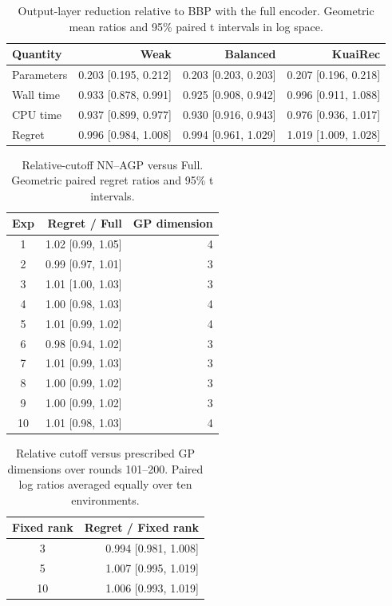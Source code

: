 \begin{table}[htbp]
\centering\small
\caption{Output-layer reduction relative to BBP with the full encoder. Geometric mean ratios and 95\% paired t intervals in log space.}
\label{tab:network-cost-detail}
\begin{tabular}{@{}lrrr@{}}
\toprule
Quantity & Weak & Balanced & KuaiRec \\
\midrule
Parameters & 0.203 [0.195, 0.212] & 0.203 [0.203, 0.203] & 0.207 [0.196, 0.218] \\
Wall time & 0.933 [0.878, 0.991] & 0.925 [0.908, 0.942] & 0.996 [0.911, 1.088] \\
CPU time & 0.937 [0.899, 0.977] & 0.930 [0.916, 0.943] & 0.976 [0.936, 1.017] \\
Regret & 0.996 [0.984, 1.008] & 0.994 [0.961, 1.029] & 1.019 [1.009, 1.028] \\
\bottomrule
\end{tabular}
\end{table}

\begin{table}[htbp]
\centering\small
\caption{Relative-cutoff NN--AGP versus Full. Geometric paired regret ratios and 95\% t intervals.}
\label{tab:direct-control}
\begin{tabular}{crr}
\toprule
Exp & Regret / Full & GP dimension \\
\midrule
1 & 1.02 [0.99, 1.05] & 4 \\
2 & 0.99 [0.97, 1.01] & 3 \\
3 & 1.01 [1.00, 1.03] & 3 \\
4 & 1.00 [0.98, 1.03] & 4 \\
5 & 1.01 [0.99, 1.02] & 4 \\
6 & 0.98 [0.94, 1.02] & 3 \\
7 & 1.01 [0.99, 1.03] & 3 \\
8 & 1.00 [0.99, 1.02] & 3 \\
9 & 1.00 [0.99, 1.02] & 3 \\
10 & 1.01 [0.98, 1.03] & 4 \\
\bottomrule
\end{tabular}
\end{table}

\begin{table}[htbp]
\centering\small
\caption{Relative cutoff versus prescribed GP dimensions over rounds 101--200. Paired log ratios averaged equally over ten environments.}
\label{tab:fixed-rank}
\begin{tabular}{cr}
\toprule
Fixed rank & Regret / Fixed rank \\
\midrule
3 & 0.994 [0.981, 1.008] \\
5 & 1.007 [0.995, 1.019] \\
10 & 1.006 [0.993, 1.019] \\
\bottomrule
\end{tabular}
\end{table}

